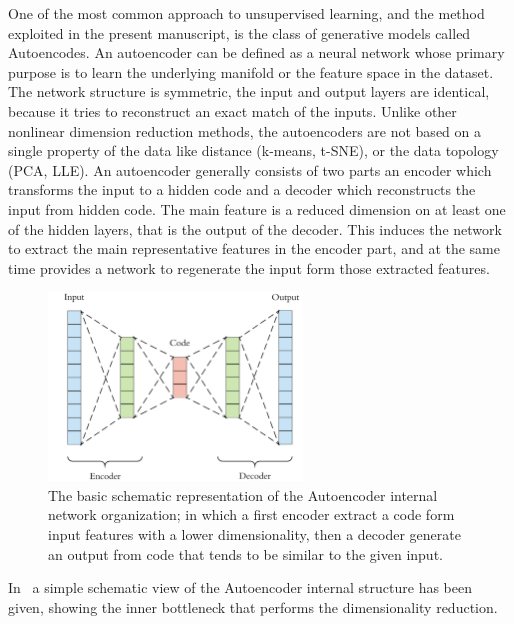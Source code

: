 One of the most common approach to unsupervised learning, and the method exploited in the present manuscript, is the class of generative models called Autoencodes.
An autoencoder can be defined as a neural network whose primary purpose is to learn the underlying manifold or the feature space in the dataset. The network structure is symmetric, the input and output layers are identical, because it tries to reconstruct an exact match of the inputs. Unlike other nonlinear dimension reduction methods, the autoencoders are not based on a single property of the data like distance (k-means, t-SNE), or the data topology (PCA, LLE). An autoencoder generally consists of two parts an encoder which transforms the input to a hidden code and a decoder which reconstructs the input from hidden code. The main feature is a reduced dimension on at least one of the hidden layers, that is the output of the decoder. This induces the network to extract the main representative features in the encoder part, and at the same time provides a network to regenerate the input form those extracted features.
\begin{figure}[h]
    \centering
    \includegraphics[height=5cm]{img/3_ML/Autoencoder.png}
    \caption{The basic schematic representation of the Autoencoder internal network organization; in which a first encoder extract a code form input features with a lower dimensionality, then a decoder generate an output from code that tends to be similar to the given input. }
    \label{fig:autoencoder}
\end{figure}
In~\Figure{\ref{fig:autoencoder}} a simple schematic view of the Autoencoder internal structure has been given, showing the inner bottleneck that performs the dimensionality reduction.



